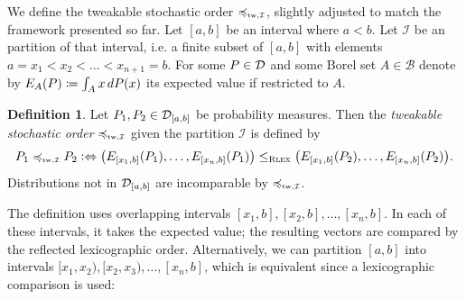 \documentclass[a4paper]{scrreprt}
\newcommand{\B}{\mathcal{B}}
\theoremstyle{definition}
\newtheorem{defn}[thm]{Definition} %
\begin{document}
    We define the tweakable stochastic order $\leqtw$, slightly adjusted to match the framework presented so far.
    Let $[a, b]$ be an interval where $a < b$. Let $\mathcal{I}$ be an partition of that interval, i.e. a finite subset of $[a, b]$ with elements $a = x_1 < x_2 < \dots < x_{n+1} = b$.
    For some $P \in \mathcal{D}$ and some Borel set $A \in \B$ denote by $E_A(P) \coloneqq \int_{A} x \, dP(x)$ its expected value if restricted to $A$. 
    \begin{defn}
        \label{def:tweakableStochasticOrder}
        Let $P_1, P_2 \in \mathcal{D}_{[a, b]}$ be probability measures.
        Then the \emph{tweakable stochastic order} $\leqtw$ given the partition $\mathcal{I}$ is defined by
        \begin{gather*}
            P_1 \leqtw P_2 \colonlra \bigpars{E_{[x_1, b]}(P_{1}), \dots, E_{[x_n, b]}(P_1)} \leqRlex \bigpars{E_{[x_1, b]}(P_2), \dots, E_{[x_n, b]}(P_2)}.
        \end{gather*}
        Distributions not in $\mathcal{D}_{[a, b]}$ are incomparable by $\leqtw$.
    \end{defn}

    The definition uses overlapping intervals $[x_1, b], [x_2, b], \dots, [x_n, b]$. In each of these intervals, it takes the expected value; the resulting vectors are compared by the reflected lexicographic order. Alternatively, we can partition $[a, b]$ into intervals $[x_1, x_2), [x_2, x_3), \dots, [x_n, b]$, which is equivalent since a lexicographic comparison is used:
\end{document}
